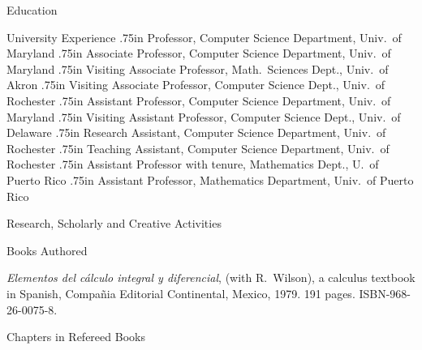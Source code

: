 \bigskip
{}
  

\bigskip
\subsec Education

\bigskip
\subsec University Experience
\medskip
{} {.75in}
Professor, Computer Science Department, Univ.~of Maryland
 {.75in}
Associate Professor, Computer Science Department, Univ.~of Maryland
 {.75in}
Visiting Associate Professor, Math.~Sciences Dept., Univ.~of Akron
 {.75in}
Visiting Associate Professor, Computer Science Dept., Univ.~of Rochester
 {.75in}
Assistant Professor, Computer Science Department, Univ.~of Maryland
 {.75in}
Visiting Assistant Professor, Computer Science Dept., Univ.~of Delaware
 {.75in}
Research Assistant, Computer Science Department, Univ.~of Rochester
 {.75in}
Teaching Assistant, Computer Science Department, Univ.~of Rochester
 {.75in}
Assistant Professor with tenure, Mathematics Dept., U.~of Puerto Rico
 {.75in}
Assistant Professor, Mathematics Department, Univ.~of Puerto Rico

\sec Research, Scholarly and Creative Activities

\subsec Books Authored

\paper
{\sl Elementos  del  c\'alculo integral y diferencial},
(with R.~Wilson), a calculus textbook in Spanish,
Compa\~nia Editorial Continental, Mexico, 1979. 191 pages.
ISBN-968-26-0075-8.





\subsec Chapters in Refereed Books

